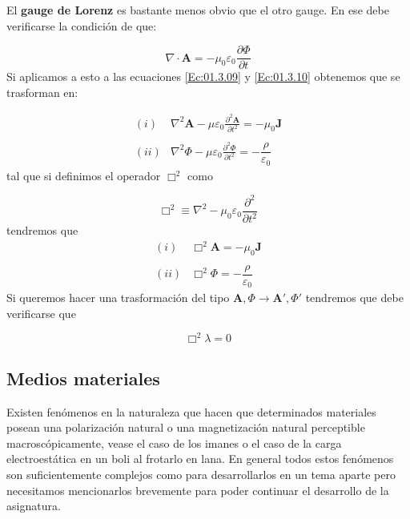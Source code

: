 \documentclass[12pt,a4paper]{article}
\newcommand{\parciales}[2]{\frac{\partial #1}{\partial #2}}
\newcommand{\dive}{\nabla \cdot}
\newcommand{\Jn}{\mathbf{J}}
\newcommand{\An}{\mathbf{A}}
\numberwithin{equation}{section}
\numberwithin{figure}{section}
\begin{document}
El \textbf{gauge de Lorenz} es bastante menos obvio que el otro gauge. En ese debe verificarse la condición de que:

\begin{equation}
\dive \An = - \mu_0 \varepsilon_0 \parciales{\Phi}{t}
\end{equation}
Si aplicamos a esto a las ecuaciones \ref{Ec:01.3.09} y \ref{Ec:01.3.10} obtenemos que se trasforman en:

\begin{equation} \begin{array}{rl} 
(i) & \nabla^2 \An - \mu \varepsilon_0 \parciales{^2 \An}{t^2} = - \mu_0 \Jn \\ \\
(ii) & \nabla^2 \Phi - \mu \varepsilon_0 \parciales{^2 \Phi}{t^2} = - \dfrac{\rho}{\varepsilon_0} 
\end{array} \label{Ec:01.3.15}
\end{equation}
tal que si definimos el operador $\Box^2$ como 

\begin{equation}
\Box^2 \equiv \nabla^2 - \mu_0 \varepsilon_0 \parciales{^2}{t^2}
\end{equation}
tendremos que
\begin{equation} \begin{array}{rl} 
(i) & \Box^2 \An = - \mu_0 \Jn \\ \\
(ii) &  \Box^2 \Phi = - \dfrac{\rho}{\varepsilon_0} \label{Ec:01.3.17}
\end{array} 
\end{equation}
Si queremos hacer una trasformación del tipo $\An, \Phi \rightarrow \An', \Phi'$ tendremos que debe verificarse que

\begin{equation}
\Box^2 \lambda = 0
\end{equation}


\subsection{Medios materiales}

Existen fenómenos en la naturaleza que hacen que determinados materiales posean una polarización natural o una magnetización natural perceptible macroscópicamente, vease el caso de los imanes o el caso de la carga electroestática en un boli al frotarlo en lana. En general todos estos fenómenos son suficientemente complejos como para desarrollarlos en un tema aparte pero necesitamos mencionarlos brevemente para poder continuar el desarrollo de la asignatura. \\
\end{document}

